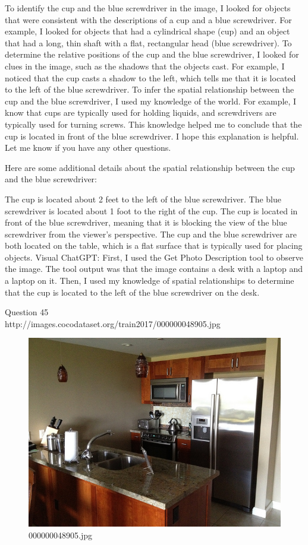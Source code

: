 \begin{enumerate}
    To identify the cup and the blue screwdriver in the image, I looked for objects that were consistent with the descriptions of a cup and a blue screwdriver. For example, I looked for objects that had a cylindrical shape (cup) and an object that had a long, thin shaft with a flat, rectangular head (blue screwdriver).
    To determine the relative positions of the cup and the blue screwdriver, I looked for clues in the image, such as the shadows that the objects cast. For example, I noticed that the cup casts a shadow to the left, which tells me that it is located to the left of the blue screwdriver.
    To infer the spatial relationship between the cup and the blue screwdriver, I used my knowledge of the world. For example, I know that cups are typically used for holding liquids, and screwdrivers are typically used for turning screws. This knowledge helped me to conclude that the cup is located in front of the blue screwdriver.
    I hope this explanation is helpful. Let me know if you have any other questions.
    
    Here are some additional details about the spatial relationship between the cup and the blue screwdriver:
    
    The cup is located about 2 feet to the left of the blue screwdriver.
    The blue screwdriver is located about 1 foot to the right of the cup.
    The cup is located in front of the blue screwdriver, meaning that it is blocking the view of the blue screwdriver from the viewer's perspective.
    The cup and the blue screwdriver are both located on the table, which is a flat surface that is typically used for placing objects.
    \subitem Visual ChatGPT: First, I used the Get Photo Description tool to observe the image. The tool output was that the image contains a desk with a laptop and a laptop on it. Then, I used my knowledge of spatial relationships to determine that the cup is located to the left of the blue screwdriver on the desk.
\end{enumerate}
Question 45\\
http://images.cocodataset.org/train2017/000000048905.jpg
\begin{figure}[h]
    \centering
    \includegraphics[width=0.8\linewidth]{../image set/hard/000000048905.jpg}
    \caption{000000048905.jpg}
\end{figure}
